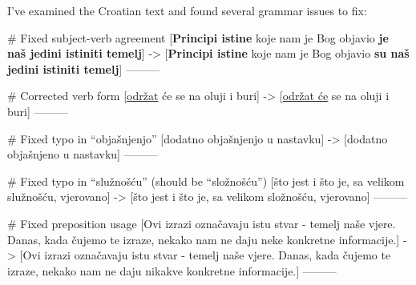 I've examined the Croatian text and found several grammar issues to fix:

# Fixed subject-verb agreement
[\textbf{Principi istine} koje nam je Bog objavio \textbf{je naš jedini istiniti temelj}]
->
[\textbf{Principi istine} koje nam je Bog objavio \textbf{su naš jedini istiniti temelj}]
---------

# Corrected verb form
[\underline{održat} će se na oluji i buri]
->
[\underline{održat će} se na oluji i buri]
---------

# Fixed typo in “objašnjenjo”
[dodatno objašnjenjo u nastavku]
->
[dodatno objašnjeno u nastavku]
---------

# Fixed typo in “služnošću” (should be “složnošću”)
[što jest i što je, sa velikom služnošću, vjerovano]
->
[što jest i što je, sa velikom složnošću, vjerovano]
---------

# Fixed preposition usage
[Ovi izrazi označavaju istu stvar - temelj naše vjere. Danas, kada čujemo te izraze, nekako nam ne daju neke konkretne informacije.]
->
[Ovi izrazi označavaju istu stvar - temelj naše vjere. Danas, kada čujemo te izraze, nekako nam ne daju nikakve konkretne informacije.]
---------